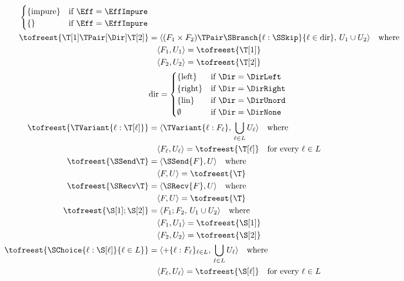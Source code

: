 \begin{figure}[tp]
\begin{align*}
\begin{cases}
        \{ \text{impure} \} & \text{if } \Eff = \EffImpure \\
        \{ \text{} \} & \text{if } \Eff = \EffImpure \\
      \end{cases} \\
    \tofreest{\T[1] \TPair[\Dir] \T[2]}
      & = \langle (F_1 \times F_2) \TPair \SBranch {\ell : \SSkip} {\ell \in \text{dir}},\,
        U_1 \cup U_2 \rangle \quad \text{where} \\
      & \quad \langle F_1, U_1 \rangle = \tofreest{\T[1]} \\
      & \quad \langle F_2, U_2 \rangle = \tofreest{\T[2]} \\
      & \text{dir} = \begin{cases}
        \{ \text{left} \} & \text{if } \Dir = \DirLeft \\
        \{ \text{right} \} & \text{if } \Dir = \DirRight \\
        \{ \text{lin} \} & \text{if } \Dir = \DirUnord \\
        \emptyset & \text{if } \Dir = \DirNone
      \end{cases} \\
    \tofreest{\TVariant{\ell:\T[\ell]}}
      & = \langle \TVariant{\ell:F_\ell},\, \bigcup_{\ell\in L} U_\ell \rangle \quad \text{where} \\
      & \quad \langle F_\ell, U_\ell \rangle = \tofreest{\T[\ell]} \quad \text{for every } \ell \in L \\
    \tofreest{\SSend\T}
      & = \langle \SSend{F}, U \rangle \quad \text{where} \\
      & \quad \langle F, U \rangle = \tofreest{\T} \\
    \tofreest{\SRecv\T}
      & = \langle \SRecv{F}, U \rangle \quad \text{where} \\
      & \quad \langle F, U \rangle = \tofreest{\T} \\
    \tofreest{\S[1] ; \S[2]}
      & = \langle F_1 ; F_2,\, U_1 \cup U_2 \rangle \quad \text{where} \\
      & \quad \langle F_1, U_1 \rangle = \tofreest{\S[1]} \\
      & \quad \langle F_2, U_2 \rangle = \tofreest{\S[2]} \\
    \tofreest{\SChoice{\ell:\S[\ell]}{\ell\in L}}
      & = \langle +\{\ell : F_\ell\}_{\ell\in L},\, \bigcup_{\ell\in L} U_\ell \rangle \quad \text{where} \\
      & \quad \langle F_\ell, U_\ell \rangle = \tofreest{\S[\ell]} \quad \text{for every } \ell \in L \\

\end{align*}
\end{figure}
